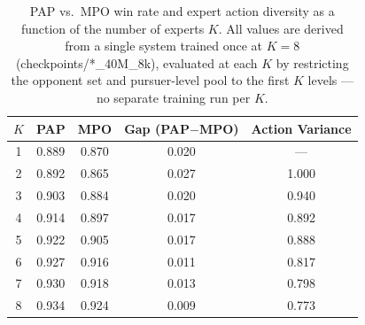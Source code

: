 
\begin{table}[t]
\centering
\caption{PAP vs.\ MPO win rate and expert action diversity as a function of the number of experts $K$. All values are derived from a single system trained once at $K{=}8$ (checkpoints/*\_40M\_8k), evaluated at each $K$ by restricting the opponent set and pursuer-level pool to the first $K$ levels --- no separate training run per $K$.}
\label{tab:fig13-sweep}
\begin{tabular}{@{}ccccc@{}}
\toprule
$K$ & PAP & MPO & Gap (PAP$-$MPO) & Action Variance \\
\midrule
1 & 0.889 & 0.870 & 0.020 & --- \\
2 & 0.892 & 0.865 & 0.027 & 1.000 \\
3 & 0.903 & 0.884 & 0.020 & 0.940 \\
4 & 0.914 & 0.897 & 0.017 & 0.892 \\
5 & 0.922 & 0.905 & 0.017 & 0.888 \\
6 & 0.927 & 0.916 & 0.011 & 0.817 \\
7 & 0.930 & 0.918 & 0.013 & 0.798 \\
8 & 0.934 & 0.924 & 0.009 & 0.773 \\
\bottomrule
\end{tabular}
\end{table}
